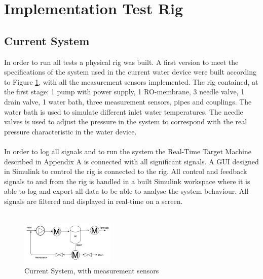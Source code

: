 \section{Implementation Test Rig}
\subsection{Current System}
In order to run all tests a physical rig was built. A first version to meet the specifications of the system used in the current water device were built according to Figure \ref{fig:MeasCurrSys}, with all the measurement sensors implemented. The rig contained, at the first stage: 1 pump with power supply, 1 RO-membrane, 3 needle valve, 1 drain valve, 1 water bath, three measurement sensors, pipes and couplings. The water bath is used to simulate different inlet water temperatures. The needle valves is used to adjust the pressure in the system to correspond with the real pressure characteristic in the water device. \\
\\
In order to log all signals and to run the system the Real-Time Target Machine described in Appendix A is connected with all significant signals. A GUI designed in Simulink to control the rig is connected to the rig. All control and feedback signals to and from the rig is handled in a built Simulink workspace where it is able to log and export all data to be able to analyse the system behaviour. All signals are filtered and displayed in real-time on a screen. \\
\\
\begin{figure}[h]
    \centering
    \includegraphics[width=0.4\textwidth]{MeasCurrSys}
    \caption{Current System, with measurement sensors}
    \label{fig:MeasCurrSys}
\end{figure}

